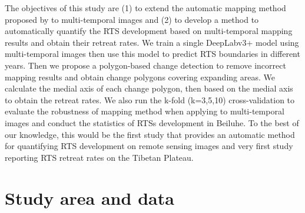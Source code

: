 \documentclass[authoryear,preprint,review,12pt]{elsarticle}
\begin{document}

The objectives of this study are (1) to extend the automatic mapping method proposed by \cite{huang2020using} to multi-temporal images and (2) to develop a method to automatically quantify the RTS development based on multi-temporal mapping results and obtain their retreat rates. 
We train a single DeepLabv3+ model using multi-temporal images then use this model to predict RTS boundaries in different years.
Then we propose a polygon-based change detection to remove incorrect mapping results and obtain change polygons covering expanding areas.  
We calculate the medial axis of each change polygon, then based on the medial axis to obtain the retreat rates.  
We also run the k-fold (k=3,5,10) cross-validation to evaluate the robustness of mapping method when applying to multi-temporal images and conduct the statistics of RTSs development in Beiluhe. 
To the best of our knowledge, this would be the first study that provides an automatic method for quantifying RTS development on remote sensing images and very first study reporting RTS retreat rates on the Tibetan Plateau. 




\section{Study area and data}
\label{sec_studyarea_data}
\end{document}
